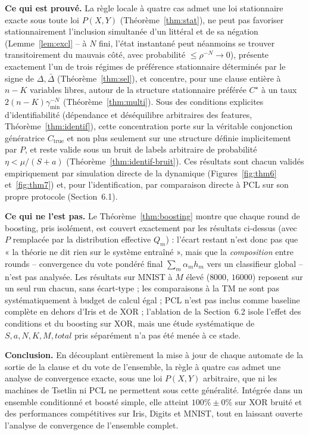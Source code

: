 \documentclass[12pt,a4paper]{article}
\begin{document}
\textbf{Ce qui est prouvé.} La règle locale à quatre cas admet une loi
stationnaire exacte sous toute loi $P(X,Y)$ (Théorème~\ref{thm:stat}), ne
peut pas favoriser stationnairement l'inclusion simultanée d'un littéral et
de sa négation (Lemme~\ref{lem:excl} -- à $N$ fini, l'état instantané peut
néanmoins se trouver transitoirement du mauvais côté, avec probabilité
$\le\rho^{-N}\to0$), présente exactement l'un de trois régimes de
préférence stationnaire déterminés par le signe de $\Delta,\bar\Delta$
(Théorème~\ref{thm:sel}), et
concentre, pour une clause entière à $n-K$ variables libres, autour de la
structure stationnaire préférée $C^\star$ à un taux $2(n-K)\gamma_{\min}^{-N}$
(Théorème~\ref{thm:multi}). Sous des conditions explicites d'identifiabilité
(dépendance et déséquilibre arbitraires des features, Théorème~\ref{thm:identif}),
cette concentration porte sur la véritable conjonction génératrice
$C_{\mathrm{true}}$ et non plus seulement sur une structure définie
implicitement par $P$, et reste valide sous un bruit de labels arbitraire
de probabilité $\eta<\mu/(S+a)$ (Théorème~\ref{thm:identif-bruit}). Ces résultats sont chacun validés
empiriquement par simulation directe de la dynamique (Figures~\ref{fig:thm6}
et~\ref{fig:thm7}) et, pour l'identification, par comparaison directe à
PCL sur son propre protocole (Section~6.1).

\textbf{Ce qui ne l'est pas.} Le Théorème~\ref{thm:boosting} montre que
chaque round de boosting, pris isolément, est couvert exactement par les
résultats ci-dessus (avec $P$ remplacée par la distribution effective
$Q_m$) : l'écart restant n'est donc pas que « la théorie ne dit rien sur
le système entraîné », mais que la \emph{composition} entre rounds --
convergence du vote pondéré final $\sum_m\alpha_m h_m$ vers un classifieur
global -- n'est pas analysée. Les résultats sur MNIST à $M$ élevé ($8000$,
$16000$) reposent sur un seul run chacun, sans écart-type ; les
comparaisons à la TM ne sont pas systématiquement à budget de calcul égal ;
PCL n'est pas inclus comme baseline complète en dehors d'Iris et de XOR ;
l'ablation de la Section~6.2 isole l'effet des conditions et du boosting
sur XOR, mais une étude systématique de $S,a,N,K,M,total$ pris séparément
n'a pas été menée à ce stade.

\textbf{Conclusion.} En découplant entièrement la mise à jour de chaque
automate de la sortie de la clause et du vote de l'ensemble, la règle à
quatre cas admet une analyse de convergence exacte, sous une loi $P(X,Y)$
arbitraire, que ni les machines de Tsetlin ni PCL ne permettent sous cette
généralité. Intégrée dans un ensemble conditionné et boosté simple, elle
atteint $100\%\pm0\%$ sur XOR bruité et des performances compétitives sur
Iris, Digits et MNIST, tout en laissant ouverte l'analyse de convergence de
l'ensemble complet.
\end{document}
